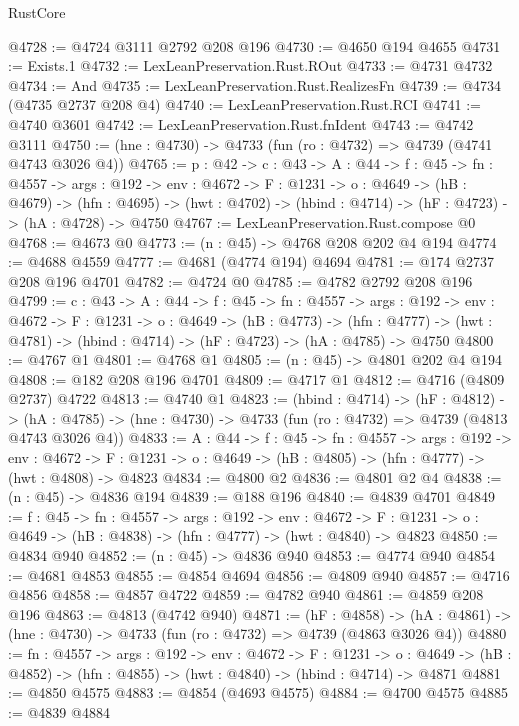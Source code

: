 \begin{lexlean}{RustCore}
\begin{coremodule}
@4728 := @4724 @3111 @2792 @208 @196
@4730 := @4650 @194 @4655
@4731 := Exists.{1}
@4732 := LexLeanPreservation.Rust.ROut
@4733 := @4731 @4732
@4734 := And
@4735 := LexLeanPreservation.Rust.RealizesFn
@4739 := @4734 (@4735 @2737 @208 @4)
@4740 := LexLeanPreservation.Rust.RCI
@4741 := @4740 @3601
@4742 := LexLeanPreservation.Rust.fnIdent
@4743 := @4742 @3111
@4750 := (hne : @4730) -> @4733 (fun (ro : @4732) => @4739 (@4741 @4743 @3026 @4))
@4765 := {p : @42} ->
  {c : @43} ->
  {A : @44} ->
  {f : @45} ->
  {fn : @4557} ->
  {args : @192} ->
  {env : @4672} ->
  {F : @1231} ->
  {o : @4649} ->
  (hB : @4679) ->
  (hfn : @4695) -> (hwt : @4702) -> (hbind : @4714) -> (hF : @4723) -> (hA : @4728) -> @4750
@4767 := LexLeanPreservation.Rust.compose @0
@4768 := @4673 @0
@4773 := (n : @45) -> @4768 @208 @202 @4 @194
@4774 := @4688 @4559
@4777 := @4681 (@4774 @194) @4694
@4781 := @174 @2737 @208 @196 @4701
@4782 := @4724 @0
@4785 := @4782 @2792 @208 @196
@4799 := {c : @43} ->
  {A : @44} ->
  {f : @45} ->
  {fn : @4557} ->
  {args : @192} ->
  {env : @4672} ->
  {F : @1231} ->
  {o : @4649} ->
  (hB : @4773) ->
  (hfn : @4777) -> (hwt : @4781) -> (hbind : @4714) -> (hF : @4723) -> (hA : @4785) -> @4750
@4800 := @4767 @1
@4801 := @4768 @1
@4805 := (n : @45) -> @4801 @202 @4 @194
@4808 := @182 @208 @196 @4701
@4809 := @4717 @1
@4812 := @4716 (@4809 @2737) @4722
@4813 := @4740 @1
@4823 := (hbind : @4714) ->
  (hF : @4812) ->
  (hA : @4785) -> (hne : @4730) -> @4733 (fun (ro : @4732) => @4739 (@4813 @4743 @3026 @4))
@4833 := {A : @44} ->
  {f : @45} ->
  {fn : @4557} ->
  {args : @192} ->
  {env : @4672} ->
  {F : @1231} -> {o : @4649} -> (hB : @4805) -> (hfn : @4777) -> (hwt : @4808) -> @4823
@4834 := @4800 @2
@4836 := @4801 @2 @4
@4838 := (n : @45) -> @4836 @194
@4839 := @188 @196
@4840 := @4839 @4701
@4849 := {f : @45} ->
  {fn : @4557} ->
  {args : @192} ->
  {env : @4672} ->
  {F : @1231} -> {o : @4649} -> (hB : @4838) -> (hfn : @4777) -> (hwt : @4840) -> @4823
@4850 := @4834 @940
@4852 := (n : @45) -> @4836 @940
@4853 := @4774 @940
@4854 := @4681 @4853
@4855 := @4854 @4694
@4856 := @4809 @940
@4857 := @4716 @4856
@4858 := @4857 @4722
@4859 := @4782 @940
@4861 := @4859 @208 @196
@4863 := @4813 (@4742 @940)
@4871 := (hF : @4858) ->
  (hA : @4861) -> (hne : @4730) -> @4733 (fun (ro : @4732) => @4739 (@4863 @3026 @4))
@4880 := {fn : @4557} ->
  {args : @192} ->
  {env : @4672} ->
  {F : @1231} ->
  {o : @4649} -> (hB : @4852) -> (hfn : @4855) -> (hwt : @4840) -> (hbind : @4714) -> @4871
@4881 := @4850 @4575
@4883 := @4854 (@4693 @4575)
@4884 := @4700 @4575
@4885 := @4839 @4884

\end{coremodule}
\end{lexlean}
